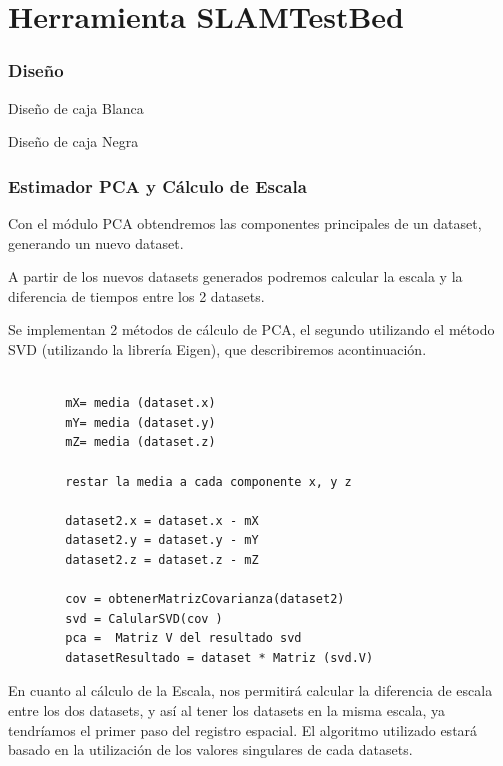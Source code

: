 \newpage
\chapter{Herramienta SLAMTestBed} \label{cap:Herramienta SLAMTestBed} %
\setcounter{section}{4}

\subsection{Diseño}
Diseño de caja Blanca

Diseño de caja Negra

\subsection{Estimador PCA y Cálculo de Escala}

	Con el módulo PCA obtendremos las componentes principales de un dataset, generando un nuevo dataset.

	A partir de los nuevos datasets generados podremos calcular la escala y la diferencia de tiempos entre los 2 datasets.

	Se implementan 2 métodos de cálculo de PCA, el segundo utilizando el método SVD (utilizando la librería Eigen), que describiremos acontinuación.

	\begin{lstlisting}
		
		mX= media (dataset.x)
		mY= media (dataset.y)
		mZ= media (dataset.z)

		restar la media a cada componente x, y z

		dataset2.x = dataset.x - mX
		dataset2.y = dataset.y - mY
		dataset2.z = dataset.z - mZ

		cov = obtenerMatrizCovarianza(dataset2)
		svd = CalularSVD(cov )
		pca =  Matriz V del resultado svd
		datasetResultado = dataset * Matriz (svd.V)

	\end{lstlisting}

    En cuanto al cálculo de la Escala, nos permitirá calcular la diferencia de escala entre los dos datasets, y así al tener los datasets en la misma escala, ya tendríamos el primer paso del registro espacial. El algoritmo utilizado estará basado en la utilización de los valores singulares de cada datasets.
        
